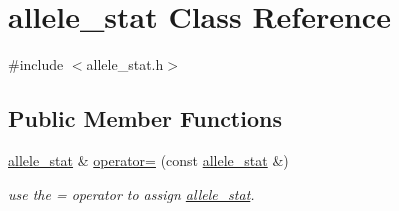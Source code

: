 \hypertarget{classallele__stat}{\section{allele\-\_\-stat Class Reference}
\label{classallele__stat}
}


{\ttfamily \#include $<$allele\-\_\-stat.\-h$>$}

\subsection*{Public Member Functions}
\begin{DoxyCompactItemize}
\item 
\hypertarget{classallele__stat_ae49a06d8ecc53bd6955f76ea1afc5a69}{\hyperlink{classallele__stat}{allele\-\_\-stat} \& \hyperlink{classallele__stat_ae49a06d8ecc53bd6955f76ea1afc5a69}{operator=} (const \hyperlink{classallele__stat}{allele\-\_\-stat} \&)}\label{classallele__stat_ae49a06d8ecc53bd6955f76ea1afc5a69}

\begin{DoxyCompactList}\small\item\em use the = operator to assign \hyperlink{classallele__stat}{allele\-\_\-stat}. \end{DoxyCompactList}\end{DoxyCompactItemize}
